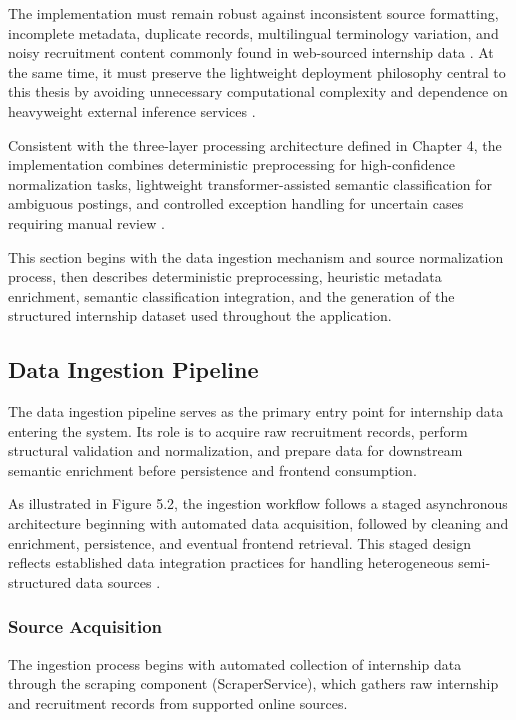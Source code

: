 The implementation must remain robust against inconsistent source formatting, incomplete metadata, duplicate records, multilingual terminology variation, and noisy recruitment content commonly found in web-sourced internship data \cite{chu2016data, sarawagi2008information}. At the same time, it must preserve the lightweight deployment philosophy central to this thesis by avoiding unnecessary computational complexity and dependence on heavyweight external inference services \cite{schwartz2020green, menghani2023efficient}.

Consistent with the three-layer processing architecture defined in Chapter 4, the implementation combines deterministic preprocessing for high-confidence normalization tasks, lightweight transformer-assisted semantic classification for ambiguous postings, and controlled exception handling for uncertain cases requiring manual review \cite{peffers2007design, bass2012software}.

This section begins with the data ingestion mechanism and source normalization process, then describes deterministic preprocessing, heuristic metadata enrichment, semantic classification integration, and the generation of the structured internship dataset used throughout the application.

\subsection{Data Ingestion Pipeline}

The data ingestion pipeline serves as the primary entry point for internship data entering the system. Its role is to acquire raw recruitment records, perform structural validation and normalization, and prepare data for downstream semantic enrichment before persistence and frontend consumption.

As illustrated in Figure 5.2, the ingestion workflow follows a staged asynchronous architecture beginning with automated data acquisition, followed by cleaning and enrichment, persistence, and eventual frontend retrieval. This staged design reflects established data integration practices for handling heterogeneous semi-structured data sources \cite{abiteboul1997querying, doan2012principles, chu2016data}.

\subsubsection*{Source Acquisition}

The ingestion process begins with automated collection of internship data through the scraping component (ScraperService), which gathers raw internship and recruitment records from supported online sources.

